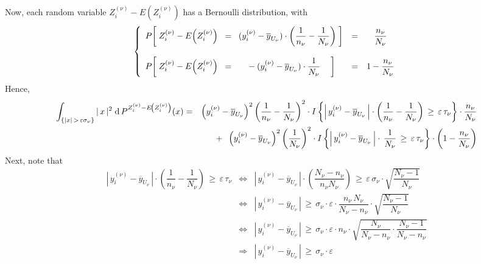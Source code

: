 Now, each random variable $Z^{(\nu)}_{i} - E\!\left(Z^{(\nu)}_{i}\right)$ has a Bernoulli distribution, with
\begin{equation*}
\left\{
\begin{array}{lcc}
P\!\left[\;
Z^{(\nu)}_{i} - E\!\left(Z^{(\nu)}_{i}\right) \;\;=\;\; (y^{(\nu)}_{i} - \overline{y}_{U_{\nu}})\cdot\left(\dfrac{1}{n_{\nu}} - \dfrac{1}{N_{\nu}}\right)
\;\right]
& = & \dfrac{n_{\nu}}{N_{\nu}}
\\ \\
P\!\left[\;
Z^{(\nu)}_{i} - E\!\left(Z^{(\nu)}_{i}\right) \;\;=\;\;
{\color{white}??}
-(y^{(\nu)}_{i} - \overline{y}_{U_{\nu}})\cdot\dfrac{1}{N_{\nu}}
{\color{white}??}\;\right]
& = & 1 - \dfrac{n_{\nu}}{N_{\nu}}
\end{array}
\right.
\end{equation*}
Hence,
\begin{eqnarray*}
\int_{\left\{\vert x\vert \,>\, \varepsilon\sigma_{\nu}\right\}}
\vert\,x\,\vert^{2}\;
\textnormal{d}\,P^{Z^{(\nu)}_{i} - E\!\left(Z^{(\nu)}_{i}\right)}(x)
&=&
\left(y^{(\nu)}_{i} - \overline{y}_{U_{\nu}}\right)^{2}\left(\dfrac{1}{n_{\nu}} - \dfrac{1}{N_{\nu}}\right)^{2} \cdot
I\left\{
\left\vert\,y^{(\nu)}_{i} - \overline{y}_{U_{\nu}}\,\right\vert
\cdot
\left(\frac{1}{n_{\nu}} - \frac{1}{N_{\nu}}\right)
\,\geq\,\varepsilon\,\tau_{\nu}
\right\}
\cdot
\dfrac{n_{\nu}}{N_{\nu}}
\\
&&
+\;\;
\left(y^{(\nu)}_{i} - \overline{y}_{U_{\nu}}\right)^{2}\left(\dfrac{1}{N_{\nu}}\right)^{2} \cdot
I\left\{
\left\vert\,y^{(\nu)}_{i} - \overline{y}_{U_{\nu}}\,\right\vert
\cdot\,
\frac{1}{N_{\nu}}
\,\geq\,\varepsilon\,\tau_{\nu}
\right\}
\cdot
\left(1 - \dfrac{n_{\nu}}{N_{\nu}}\right)
\end{eqnarray*}
Next, note that
\begin{eqnarray*}
\left\vert\,y^{(\nu)}_{i} - \overline{y}_{U_{\nu}}\,\right\vert
\cdot
\left(\dfrac{1}{n_{\nu}} - \dfrac{1}{N_{\nu}}\right)
\,\geq\,\varepsilon\,\tau_{\nu}
&\Longleftrightarrow&
\left\vert\,y^{(\nu)}_{i} - \overline{y}_{U_{\nu}}\,\right\vert
\cdot
\left(\dfrac{N_{\nu} - n_{\nu}}{n_{\nu}N_{\nu}}\right)
\,\geq\,\varepsilon\,\sigma_{\nu}
\cdot
\sqrt{\dfrac{N_{\nu}-1}{N_{\nu}}}
\\
&\Longleftrightarrow&
\left\vert\,y^{(\nu)}_{i} - \overline{y}_{U_{\nu}}\,\right\vert
\,\geq\,
\sigma_{\nu}\cdot\varepsilon
\cdot
\dfrac{n_{\nu}\,N_{\nu}}{N_{\nu} - n_{\nu}}
\cdot
\sqrt{\dfrac{N_{\nu}-1}{N_{\nu}}}
\\
&\Longleftrightarrow&
\left\vert\,y^{(\nu)}_{i} - \overline{y}_{U_{\nu}}\,\right\vert
\,\geq\,
\sigma_{\nu}\cdot\varepsilon
\cdot n_{\nu} \cdot
\sqrt{\dfrac{N_{\nu}}{N_{\nu} - n_{\nu}}\cdot\dfrac{N_{\nu}-1}{N_{\nu} - n_{\nu}}}
\\
&\Longrightarrow&
\left\vert\,y^{(\nu)}_{i} - \overline{y}_{U_{\nu}}\,\right\vert
\,\geq\,
\sigma_{\nu}\cdot\varepsilon
\end{eqnarray*}
